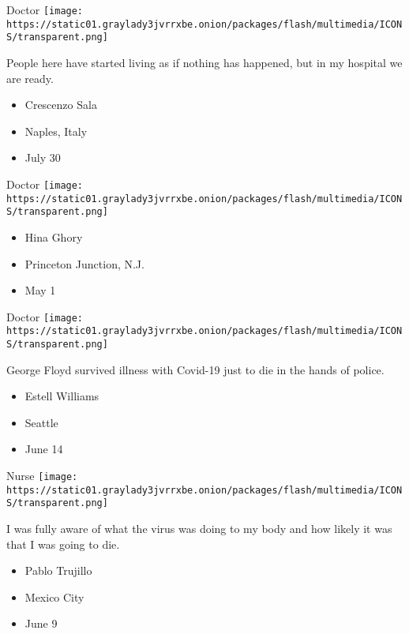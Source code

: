 Doctor
\texttt{[image: https://static01.graylady3jvrrxbe.onion/packages/flash/multimedia/ICONS/transparent.png]}

People here have started living as if nothing has happened, but in my
hospital we are ready.

\begin{itemize}
\tightlist
\item
  Crescenzo Sala
\item
  Naples, Italy
\item
  July 30
\end{itemize}

\protect\hyperlink{item-hina-ghory}{}

Doctor
\texttt{[image: https://static01.graylady3jvrrxbe.onion/packages/flash/multimedia/ICONS/transparent.png]}

\begin{itemize}
\tightlist
\item
  Hina Ghory
\item
  Princeton Junction, N.J.
\item
  May 1
\end{itemize}

\protect\hyperlink{item-estell-williams}{}

Doctor
\texttt{[image: https://static01.graylady3jvrrxbe.onion/packages/flash/multimedia/ICONS/transparent.png]}

George Floyd survived illness with Covid-19 just to die in the hands of
police.

\begin{itemize}
\tightlist
\item
  Estell Williams
\item
  Seattle
\item
  June 14
\end{itemize}

\protect\hyperlink{item-pablo-trujillo}{}

Nurse
\texttt{[image: https://static01.graylady3jvrrxbe.onion/packages/flash/multimedia/ICONS/transparent.png]}

I was fully aware of what the virus was doing to my body and how likely
it was that I was going to die.

\begin{itemize}
\tightlist
\item
  Pablo Trujillo
\item
  Mexico City
\item
  June 9
\end{itemize}

